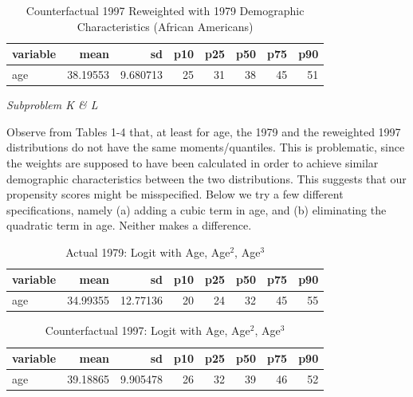 \documentclass[11pt]{article}
\begin{document}
\begin{table}[H]\centering
	\caption{Counterfactual 1997 Reweighted with 1979 Demographic Characteristics (African Americans)}{\label{} 
		\textbf{} }\begin{tabular} {@{} l r r r r r r r @{}} \\ \hline
		\textbf{variable } & \textbf{      mean} & \textbf{        sd} & \textbf{       p10} &
		\textbf{       p25} & \textbf{       p50} & \textbf{       p75} & \textbf{       p90} \\
		\hline
		age  &   38.19553 &   9.680713 &         25 &         31 &         38 &        
		45 &         51 \\
		\hline
	\end{tabular}
\end{table}

\bigskip \textit{Subproblem K \& L}

\bigskip Observe from Tables 1-4 that, at least for age, the 1979 and the reweighted 1997 distributions do not have the same moments/quantiles. This is problematic, since the weights are supposed to have been calculated in order to achieve similar demographic characteristics between the two distributions. This suggests that our propensity scores might be misspecified. Below we try a few different specifications, namely (a) adding a cubic term in age, and (b) eliminating the quadratic term in age. Neither makes a difference.

\begin{table}[H]\centering
	\caption{Actual 1979: Logit with Age, Age$^2$, Age$^3$}{\label{} 
		\textbf{} }\begin{tabular} {@{} l r r r r r r r @{}} \\ \hline
		\textbf{variable } & \textbf{      mean} & \textbf{        sd} & \textbf{       p10} &
		\textbf{       p25} & \textbf{       p50} & \textbf{       p75} & \textbf{       p90} \\
		\hline
		age  &   34.99355 &   12.77136 &         20 &         24 &         32 &        
		45 &         55 \\
		\hline
	\end{tabular}
\end{table}

\begin{table}[H]\centering
	\caption{Counterfactual 1997: Logit with Age, Age$^2$, Age$^3$}{\label{} 
		\textbf{} }\begin{tabular} {@{} l r r r r r r r @{}} \\ \hline
		\textbf{variable } & \textbf{      mean} & \textbf{        sd} & \textbf{       p10} &
		\textbf{       p25} & \textbf{       p50} & \textbf{       p75} & \textbf{       p90} \\
		\hline
		age  &   39.18865 &   9.905478 &         26 &         32 &         39 &        
		46 &         52 \\
		\hline
	\end{tabular}
\end{table}
\end{document}
